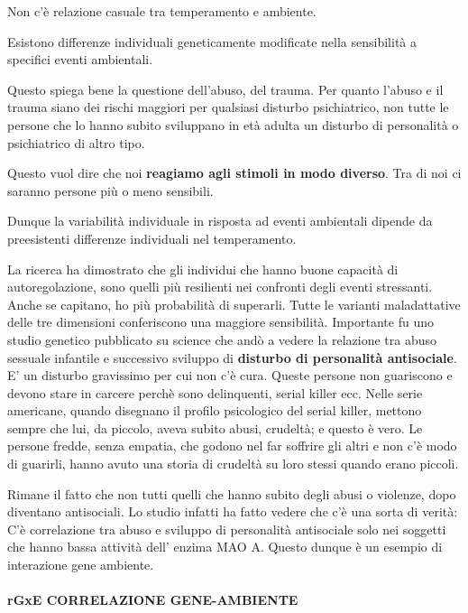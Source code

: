 Non
c'è relazione casuale tra temperamento e ambiente.

Esistono differenze individuali geneticamente modificate nella
sensibilità a specifici eventi ambientali.

Questo spiega bene la questione dell'abuso, del trauma. Per quanto
l'abuso e il trauma siano dei rischi maggiori per qualsiasi disturbo
psichiatrico, non tutte le persone che lo hanno subito sviluppano in età
adulta un disturbo di personalità o psichiatrico di altro tipo.

Questo vuol dire che noi \textbf{reagiamo agli stimoli in modo diverso}.
Tra di noi ci saranno persone più o meno sensibili.

Dunque la variabilità individuale in risposta ad eventi ambientali
dipende da preesistenti differenze individuali nel temperamento.

La ricerca ha dimostrato che gli individui che hanno buone capacità di
autoregolazione, sono quelli più resilienti nei confronti degli eventi
stressanti. Anche se capitano, ho più probabilità di superarli. Tutte le
varianti maladattative delle tre dimensioni conferiscono una maggiore
sensibilità. Importante fu uno studio genetico pubblicato su science che
andò a vedere la relazione tra abuso sessuale infantile e successivo
sviluppo di \textbf{disturbo di personalità antisociale}. E' un disturbo
gravissimo per cui non c'è cura. Queste persone non guariscono e devono
stare in carcere perchè sono delinquenti, serial killer ecc. Nelle serie
americane, quando disegnano il profilo psicologico del serial killer,
mettono sempre che lui, da piccolo, aveva subito abusi, crudeltà; e
questo è vero. Le persone fredde, senza empatia, che godono nel far
soffrire gli altri e non c'è modo di guarirli, hanno avuto una storia di
crudeltà su loro stessi quando erano piccoli.

Rimane il fatto che non tutti quelli che hanno subito degli abusi o
violenze, dopo diventano antisociali. Lo studio infatti ha fatto vedere
che c'è una sorta di verità: C'è correlazione tra abuso e sviluppo di
personalità antisociale solo nei soggetti che hanno bassa attività dell'
enzima MAO A. Questo dunque è un esempio di interazione gene ambiente.

\paragraph{rGxE CORRELAZIONE GENE-AMBIENTE}

